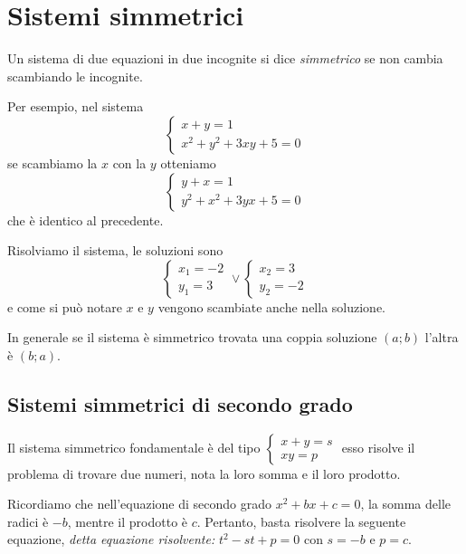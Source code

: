 \section{Sistemi simmetrici}
\label{sec:eq2gr_sistemi_simmetrici}

Un sistema di due equazioni in due incognite si dice \emph{simmetrico} se non 
cambia scambiando le incognite.

Per esempio, nel sistema 
\[\left\{\begin{array}{l}{x+y=1}\\{x^2+y^2+3{xy}+5=0}\end{array}\right.\] se 
scambiamo la $x$ con la $y$ otteniamo 
\[\left\{\begin{array}{l}{y+x=1}\\{y^2+x^2+3{yx}+5=0}\end{array}\right.\] che è 
identico al precedente.

Risolviamo il sistema, le soluzioni sono 
\[\left\{\begin{array}{l}{x_1=-2}\\{y_1=3}\end{array}\right.\vee 
\left\{\begin{array}{l}{x_2=3}\\{y_2=-2}\end{array}\right.\] 
e come si può notare $x$ e $y$ vengono scambiate anche nella soluzione.

In generale se il sistema è simmetrico trovata una coppia soluzione $(a;b)$ 
l'altra è $(b;a)$.

\subsection{Sistemi simmetrici di secondo grado}
Il sistema simmetrico fondamentale è del tipo 
$\left\{\begin{array}{l}{x+y=s}\\{xy=p}\end{array}\right.$ esso risolve il 
problema di trovare due numeri, nota la loro somma e il loro prodotto.

Ricordiamo che nell'equazione di secondo grado $x^2+bx+c=0$, la somma delle 
radici è $-b$, mentre il prodotto è $c$. Pertanto, basta risolvere la seguente 
equazione, \emph{detta equazione risolvente: } $t^2-st+p=0$ con $s=-b$ e $p=c$.

